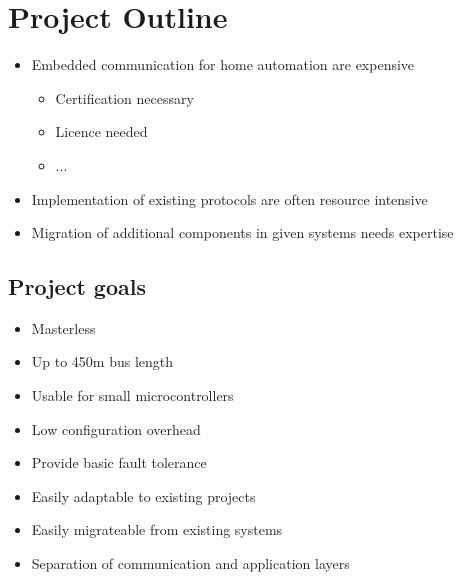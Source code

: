  



\section{Project Outline}
\begin{center}
\begin{itemize}
  \item Embedded communication for home automation are expensive
    \begin{itemize}
      \item Certification necessary
      \item Licence needed
      \item ...
    \end{itemize}
  \item Implementation of existing protocols are often resource intensive
  \item Migration of additional components in given systems needs expertise
\end{itemize}
\end{center}

\subsection{Project goals}
\begin{center}
\begin{itemize}
 \item \begin{large}Masterless\end{large}
 \item \begin{large}Up to 450m bus length\end{large}
 \item \begin{large}Usable for small microcontrollers\end{large}
 \item \begin{large}Low configuration overhead\end{large}
 \item \begin{large}Provide basic fault tolerance\end{large}
 \item \begin{large}Easily adaptable to existing projects\end{large}
 \item \begin{large}Easily migrateable from existing systems\end{large}
 \item \begin{large}Separation of communication and application layers\end{large}
\end{itemize}
\end{center}


